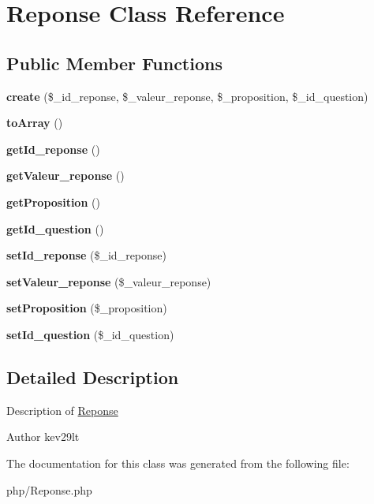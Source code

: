 \hypertarget{class_reponse}{}\section{Reponse Class Reference}
\label{class_reponse}
\subsection*{Public Member Functions}
\begin{DoxyCompactItemize}
\item 
\mbox{\label{class_reponse_a04394c526e384d35e37a8acd1842d95b}} 
{\bfseries create} (\$\+\_\+id\+\_\+reponse, \$\+\_\+valeur\+\_\+reponse, \$\+\_\+proposition, \$\+\_\+id\+\_\+question)
\item 
\mbox{\label{class_reponse_a658defb34762c8f40085aec87e16ba1a}} 
{\bfseries to\+Array} ()
\item 
\mbox{\label{class_reponse_a6c71f5f00ab3bb53e36ee5ca14ca1c0a}} 
{\bfseries get\+Id\+\_\+reponse} ()
\item 
\mbox{\label{class_reponse_aa18ba1d4aaf97a6ff8bd5d1eca4bd732}} 
{\bfseries get\+Valeur\+\_\+reponse} ()
\item 
\mbox{\label{class_reponse_aa37187d64f069bb4138a898dc861dcc9}} 
{\bfseries get\+Proposition} ()
\item 
\mbox{\label{class_reponse_a1fbf0c8124cfe5071f083c38d0494acb}} 
{\bfseries get\+Id\+\_\+question} ()
\item 
\mbox{\label{class_reponse_ad95b5b2facbafa58b30f9aa43aaefb03}} 
{\bfseries set\+Id\+\_\+reponse} (\$\+\_\+id\+\_\+reponse)
\item 
\mbox{\label{class_reponse_ac8186b93312e73ca020b4df1f20f654b}} 
{\bfseries set\+Valeur\+\_\+reponse} (\$\+\_\+valeur\+\_\+reponse)
\item 
\mbox{\label{class_reponse_a69f05487b0db2d2a7990b9eba3302c95}} 
{\bfseries set\+Proposition} (\$\+\_\+proposition)
\item 
\mbox{\label{class_reponse_ac24eebef0d2ff0f8671de8c88136c189}} 
{\bfseries set\+Id\+\_\+question} (\$\+\_\+id\+\_\+question)
\end{DoxyCompactItemize}


\subsection{Detailed Description}
Description of \mbox{\hyperlink{class_reponse}{Reponse}}

\begin{DoxyAuthor}{Author}
kev29lt 
\end{DoxyAuthor}


The documentation for this class was generated from the following file\+:\begin{DoxyCompactItemize}
\item 
php/Reponse.\+php\end{DoxyCompactItemize}
